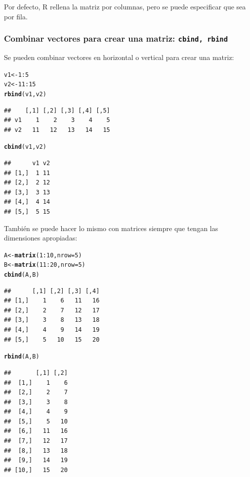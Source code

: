 \documentclass{config/apuntes}\usepackage[]{graphicx}\usepackage[]{xcolor}
\makeatletter
\newcommand{\hlnum}[1]{\textcolor[rgb]{0.686,0.059,0.569}{#1}}%
\newcommand{\hlopt}[1]{\textcolor[rgb]{0,0,0}{#1}}%
\newcommand{\hldef}[1]{\textcolor[rgb]{0.345,0.345,0.345}{#1}}%
\newcommand{\hlkwb}[1]{\textcolor[rgb]{0.69,0.353,0.396}{#1}}%
\newcommand{\hlkwc}[1]{\textcolor[rgb]{0.333,0.667,0.333}{#1}}%
\newcommand{\hlkwd}[1]{\textcolor[rgb]{0.737,0.353,0.396}{\textbf{#1}}}%
\newenvironment{kframe}{%
 \def\at@end@of@kframe{}%
 \ifinner\ifhmode%
  \def\at@end@of@kframe{\end{minipage}}%
  \begin{minipage}{\columnwidth}%
 \fi\fi%
 \def\FrameCommand##1{\hskip\@totalleftmargin \hskip-\fboxsep
 \colorbox{shadecolor}{##1}\hskip-\fboxsep
     \hskip-\linewidth \hskip-\@totalleftmargin \hskip\columnwidth}%
 \MakeFramed {\advance\hsize-\width
   \@totalleftmargin\z@ \linewidth\hsize
   \@setminipage}}%
 {\par\unskip\endMakeFramed%
 \at@end@of@kframe}
\newenvironment{knitrout}{}{} %
\newcommand{\code}[1]{\texttt{#1}}
\makeatother
\begin{document}
Por defecto, R rellena la matriz por columnas, pero se puede especificar que sea por fila. 

\subsubsection{Combinar vectores para crear una matriz: \code{cbind, rbind}}
Se pueden combinar vectores en horizontal o vertical para crear una matriz:
\begin{knitrout}
\color{fgcolor}\begin{kframe}
\begin{alltt}
\hldef{v1} \hlkwb{<-} \hlnum{1}\hlopt{:}\hlnum{5}
\hldef{v2} \hlkwb{<-} \hlnum{11}\hlopt{:}\hlnum{15}
\hlkwd{rbind}\hldef{(v1, v2)}
\end{alltt}
\begin{verbatim}
##    [,1] [,2] [,3] [,4] [,5]
## v1    1    2    3    4    5
## v2   11   12   13   14   15
\end{verbatim}
\begin{alltt}
\hlkwd{cbind}\hldef{(v1, v2)}
\end{alltt}
\begin{verbatim}
##      v1 v2
## [1,]  1 11
## [2,]  2 12
## [3,]  3 13
## [4,]  4 14
## [5,]  5 15
\end{verbatim}
\end{kframe}
\end{knitrout}

También se puede hacer lo mismo con matrices siempre que tengan las dimensiones apropiadas:
\begin{knitrout}
\color{fgcolor}\begin{kframe}
\begin{alltt}
\hldef{A} \hlkwb{<-} \hlkwd{matrix}\hldef{(}\hlnum{1}\hlopt{:}\hlnum{10}\hldef{,} \hlkwc{nrow} \hldef{=} \hlnum{5}\hldef{)}
\hldef{B} \hlkwb{<-} \hlkwd{matrix}\hldef{(}\hlnum{11}\hlopt{:}\hlnum{20}\hldef{,} \hlkwc{nrow} \hldef{=} \hlnum{5}\hldef{)}
\hlkwd{cbind}\hldef{(A, B)}
\end{alltt}
\begin{verbatim}
##      [,1] [,2] [,3] [,4]
## [1,]    1    6   11   16
## [2,]    2    7   12   17
## [3,]    3    8   13   18
## [4,]    4    9   14   19
## [5,]    5   10   15   20
\end{verbatim}
\begin{alltt}
\hlkwd{rbind}\hldef{(A, B)}
\end{alltt}
\begin{verbatim}
##       [,1] [,2]
##  [1,]    1    6
##  [2,]    2    7
##  [3,]    3    8
##  [4,]    4    9
##  [5,]    5   10
##  [6,]   11   16
##  [7,]   12   17
##  [8,]   13   18
##  [9,]   14   19
## [10,]   15   20
\end{verbatim}
\end{kframe}
\end{knitrout}
\end{document}
